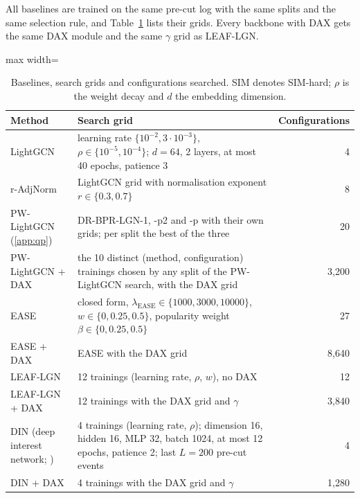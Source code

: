 \documentclass[preprint,12pt,authoryear]{elsarticle}
\begin{document}
All baselines are trained on the same pre-cut log with the same splits and the same selection rule, and Table~\ref{tab:baselines} lists their grids. Every backbone with DAX gets the same DAX module and the
same $\gamma$ grid as LEAF-LGN.

\begin{table}[t]
\centering
\caption{Baselines, search grids and configurations searched. SIM denotes SIM-hard; $\rho$ is the weight decay and $d$ the embedding dimension.}
\label{tab:baselines}
\footnotesize
\begin{adjustbox}{max width=\textwidth}
\begin{tabular}{p{}p{}r}
\toprule
Method & Search grid & Configurations \\
\midrule
\raggedright LightGCN \citep{he2020lightgcn} & \raggedright learning rate $\{10^{-2},3\cdot10^{-3}\}$, $\rho\in\{10^{-5},10^{-4}\}$; $d=64$, 2 layers, at most 40 epochs, patience 3 & 4 \\
\raggedright r-AdjNorm \citep{zhao2022radjnorm} & \raggedright LightGCN grid with normalisation exponent $r\in\{0.3,0.7\}$ & 8 \\
\raggedright PW-LightGCN (\ref{app:qp}) & \raggedright DR-BPR-LGN-1, -p2 and -p with their own grids; per split the best of the three & 20 \\
\raggedright PW-LightGCN + DAX & \raggedright the 10 distinct (method, configuration) trainings chosen by any split of the PW-LightGCN search, with the DAX grid & 3,200 \\
\raggedright EASE \citep{steck2019ease} & \raggedright closed form, $\lambda_{\mathrm{EASE}}\in\{1000,3000,10000\}$, $w\in\{0,0.25,0.5\}$, popularity weight $\beta\in\{0,0.25,0.5\}$ & 27 \\
\raggedright EASE + DAX & \raggedright EASE with the DAX grid & 8,640 \\
\raggedright LEAF-LGN & \raggedright 12 trainings (learning rate, $\rho$, $w$), no DAX & 12 \\
\raggedright LEAF-LGN + DAX & \raggedright 12 trainings with the DAX grid and $\gamma$ & 3,840 \\
\raggedright DIN (deep interest network; \citealp{zhou2018din}) & \raggedright 4 trainings (learning rate, $\rho$); dimension 16, hidden 16, MLP 32, batch 1024, at most 12 epochs, patience 2; last $L=200$ pre-cut events & 4 \\
\raggedright DIN + DAX & \raggedright 4 trainings with the DAX grid and $\gamma$ & 1,280 \\

\end{tabular}
\end{adjustbox}
\end{table}
\end{document}
